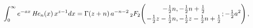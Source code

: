 \[\int_{0}^{\infty}e^{-ax}\mathop{\mathit{He}_{n}\/}\nolimits\!\left(x\right)x^{%
z-1}dx=\mathop{\Gamma\/}\nolimits\!\left(z+n\right)a^{-n-2}\mathop{{{}_{2}F_{2%
}}\/}\nolimits\!\left({-\tfrac{1}{2}n,-\tfrac{1}{2}n+\tfrac{1}{2}\atop-\tfrac{%
1}{2}z-\tfrac{1}{2}n,-\tfrac{1}{2}z-\tfrac{1}{2}n+\tfrac{1}{2}};-\tfrac{1}{2}a%
^{2}\right),\]